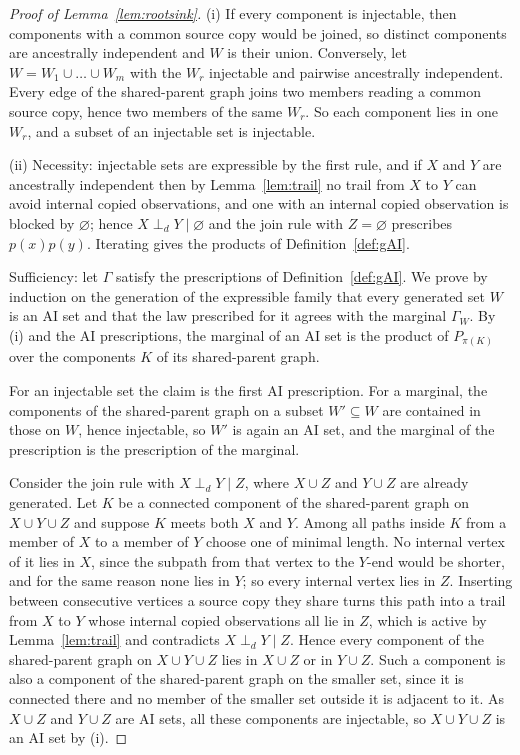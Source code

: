 \documentclass[11pt]{article}
\theoremstyle{plain}
\theoremstyle{definition}
\begin{document}
\begin{proof}[Proof of Lemma~\ref{lem:rootsink}]
(i) If every component is injectable, then components with a common source copy would be joined, so distinct components are ancestrally independent and $W$ is their union. Conversely, let $W=W_1\cup\dots\cup W_m$ with the $W_r$ injectable and pairwise ancestrally independent. Every edge of the shared-parent graph joins two members reading a common source copy, hence two members of the same $W_r$. So each component lies in one $W_r$, and a subset of an injectable set is injectable.

(ii) Necessity: injectable sets are expressible by the first rule, and if $X$ and $Y$ are ancestrally independent then by Lemma~\ref{lem:trail} no trail from $X$ to $Y$ can avoid internal copied observations, and one with an internal copied observation is blocked by $\varnothing$; hence $X\perp_dY\mid\varnothing$ and the join rule with $Z=\varnothing$ prescribes $p(x)p(y)$. Iterating gives the products of Definition~\ref{def:gAI}.

Sufficiency: let $\Gamma$ satisfy the prescriptions of Definition~\ref{def:gAI}. We prove by induction on the generation of the expressible family that every generated set $W$ is an AI set and that the law prescribed for it agrees with the marginal $\Gamma_W$. By (i) and the AI prescriptions, the marginal of an AI set is the product of $P_{\pi(K)}$ over the components $K$ of its shared-parent graph.

For an injectable set the claim is the first AI prescription. For a marginal, the components of the shared-parent graph on a subset $W'\subseteq W$ are contained in those on $W$, hence injectable, so $W'$ is again an AI set, and the marginal of the prescription is the prescription of the marginal.

Consider the join rule with $X\perp_dY\mid Z$, where $X\cup Z$ and $Y\cup Z$ are already generated. Let $K$ be a connected component of the shared-parent graph on $X\cup Y\cup Z$ and suppose $K$ meets both $X$ and $Y$. Among all paths inside $K$ from a member of $X$ to a member of $Y$ choose one of minimal length. No internal vertex of it lies in $X$, since the subpath from that vertex to the $Y$-end would be shorter, and for the same reason none lies in $Y$; so every internal vertex lies in $Z$. Inserting between consecutive vertices a source copy they share turns this path into a trail from $X$ to $Y$ whose internal copied observations all lie in $Z$, which is active by Lemma~\ref{lem:trail} and contradicts $X\perp_dY\mid Z$. Hence every component of the shared-parent graph on $X\cup Y\cup Z$ lies in $X\cup Z$ or in $Y\cup Z$. Such a component is also a component of the shared-parent graph on the smaller set, since it is connected there and no member of the smaller set outside it is adjacent to it. As $X\cup Z$ and $Y\cup Z$ are AI sets, all these components are injectable, so $X\cup Y\cup Z$ is an AI set by (i).


\end{proof}
\end{document}
